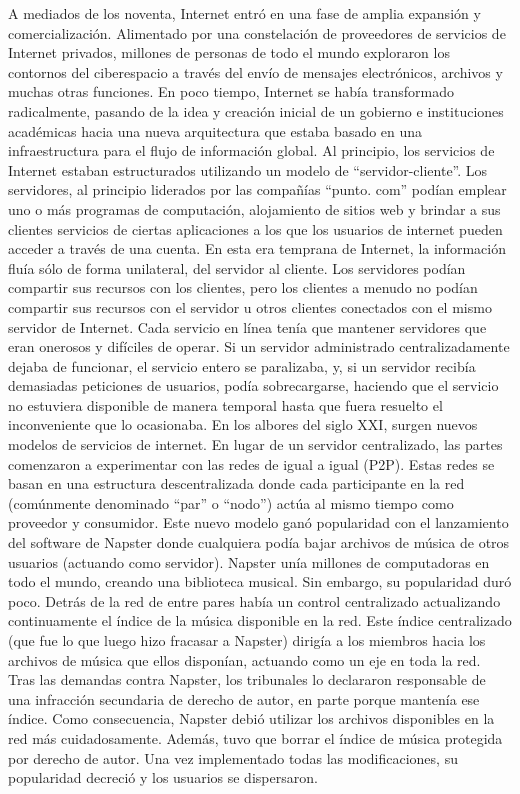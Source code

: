 \documentclass[12pt]{report} %
\begin{document}
A mediados de los noventa, Internet entró en una fase de amplia expansión y comercialización. Alimentado por una constelación de proveedores de servicios de Internet privados, millones de personas de todo el mundo exploraron los contornos del ciberespacio a través del envío de mensajes electrónicos, archivos y muchas otras funciones. En poco tiempo, Internet se había transformado radicalmente, pasando de la idea y creación inicial de un gobierno e instituciones académicas hacia una nueva arquitectura que estaba basado en una infraestructura para el flujo de información global.
Al principio, los servicios de Internet estaban estructurados utilizando un modelo de “servidor-cliente”. Los servidores, al principio liderados por las compañías “punto. com” podían emplear uno o más programas de computación, alojamiento de sitios web y brindar a sus clientes servicios de ciertas aplicaciones a los que los usuarios de internet pueden acceder a través de una cuenta. En esta era temprana de Internet, la información fluía sólo de forma unilateral, del servidor al cliente. Los servidores podían compartir sus recursos con los clientes, pero los clientes a menudo no podían compartir sus recursos con el servidor u otros clientes conectados con el mismo servidor de Internet. Cada servicio en línea tenía que mantener servidores que eran onerosos y difíciles de operar. Si un servidor administrado centralizadamente dejaba de funcionar, el servicio entero se paralizaba, y, si un servidor recibía demasiadas peticiones de usuarios, podía sobrecargarse, haciendo que el servicio no estuviera disponible de manera temporal hasta que fuera resuelto el inconveniente que lo ocasionaba.
En los albores del siglo XXI, surgen nuevos modelos de servicios de internet. En lugar de un servidor centralizado, las partes comenzaron a experimentar con las redes de igual a igual (P2P). Estas redes se basan en una estructura descentralizada donde cada participante en la red (comúnmente denominado “par” o “nodo”) actúa al mismo tiempo como proveedor y consumidor. Este nuevo modelo ganó popularidad con el lanzamiento del software de Napster donde cualquiera podía bajar archivos de música de otros usuarios (actuando como servidor). Napster unía millones de computadoras en todo el mundo, creando una biblioteca musical. Sin embargo, su popularidad duró poco. Detrás de la red de entre pares había un control centralizado actualizando continuamente el índice de la música disponible en la red. Este índice centralizado (que fue lo que luego hizo fracasar a Napster) dirigía a los miembros hacia los archivos de música que ellos disponían, actuando como un eje en toda la red. Tras las demandas contra Napster, los tribunales lo declararon responsable de una infracción secundaria de derecho de autor, en parte porque mantenía ese índice. Como consecuencia, Napster debió utilizar los archivos disponibles en la red más cuidadosamente. Además, tuvo que borrar el índice de música protegida por derecho de autor. Una vez implementado todas las modificaciones, su popularidad decreció y los usuarios se dispersaron.
\end{document}
